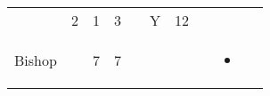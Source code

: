 \documentclass[12pt]{article}
\begin{document}
\begin{longtable}[]{@{}llllllllll@{}}
\begin{minipage}[t]{0.06\columnwidth}
\strut\end{minipage} &
\begin{minipage}[t]{0.06\columnwidth}\raggedright\strut
2
\strut\end{minipage} &
\begin{minipage}[t]{0.06\columnwidth}\raggedright\strut
1
\strut\end{minipage} &
\begin{minipage}[t]{0.06\columnwidth}\raggedright\strut
3
\strut\end{minipage} &
\begin{minipage}[t]{0.06\columnwidth}\raggedright\strut
\strut\end{minipage} &
\begin{minipage}[t]{0.07\columnwidth}\raggedright\strut
Y
\strut\end{minipage} &
\begin{minipage}[t]{0.08\columnwidth}\raggedright\strut
12
\strut\end{minipage}\tabularnewline
\begin{minipage}[t]{0.13\columnwidth}\raggedright\strut
Bishop
\strut\end{minipage} &
\begin{minipage}[t]{0.06\columnwidth}\raggedright\strut
\strut\end{minipage} &
\begin{minipage}[t]{0.06\columnwidth}\raggedright\strut
7
\strut\end{minipage} &
\begin{minipage}[t]{0.06\columnwidth}\raggedright\strut
7
\strut\end{minipage} &
\begin{minipage}[t]{0.06\columnwidth}\raggedright\strut
\strut\end{minipage} &
\begin{minipage}[t]{0.06\columnwidth}\raggedright\strut
\strut\end{minipage} &
\begin{minipage}[t]{0.06\columnwidth}\raggedright\strut
\strut\end{minipage} &
\begin{minipage}[t]{0.06\columnwidth}\raggedright\strut
\strut\end{minipage} &
\begin{minipage}[t]{0.07\columnwidth}\raggedright\strut
\begin{itemize}
\item
\end{itemize}
\strut\end{minipage} &

\end{longtable}
\end{document}
